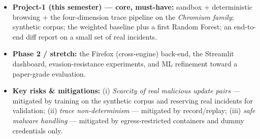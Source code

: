 \documentclass[11pt]{article}
\newcommand{\dem}[1]{\textbf{#1}}
\begin{document}
\begin{itemize}[leftmargin=1.4em,itemsep=0.2em]
\item \dem{Project-1 (this semester) --- core, must-have:} sandbox + deterministic browsing + the
four-dimension trace pipeline on the \emph{Chromium family}; synthetic corpus; the weighted baseline
plus a first Random Forest; an end-to-end diff report on a small set of real incidents.
\item \dem{Phase 2 / stretch:} the Firefox (cross-engine) back-end, the Streamlit dashboard,
evasion-resistance experiments, and ML refinement toward a paper-grade evaluation.
\item \dem{Key risks \& mitigations:} (i) \emph{Scarcity of real malicious update pairs} --- mitigated
by training on the synthetic corpus and reserving real incidents for validation; (ii) \emph{trace
non-determinism} --- mitigated by record/replay; (iii) \emph{safe malware handling} --- mitigated by
egress-restricted containers and dummy credentials only.
\end{itemize}

\end{document}
